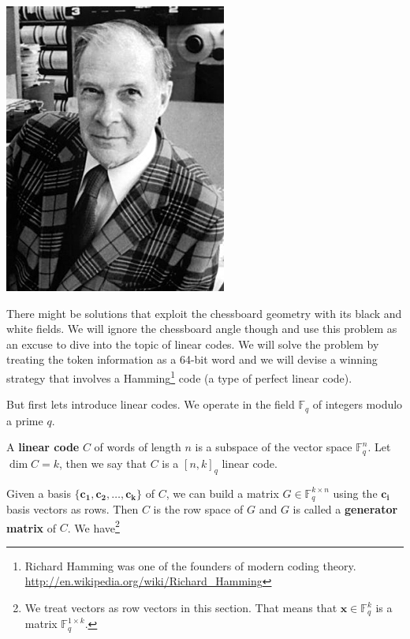 \begin{marginfigure}[0.0in]
\includegraphics[scale=0.5]{Richard_Hamming.jpg}
\end{marginfigure}

There might be solutions that exploit the chessboard geometry with its black and white fields. We will ignore the chessboard angle though and use this problem as an excuse to dive into the topic of linear codes. We will solve the problem by treating the token information as a 64-bit word and we will devise a winning strategy that involves a Hamming\footnote{Richard Hamming was one of the founders of modern coding theory. \url{http://en.wikipedia.org/wiki/Richard_Hamming}} code (a type of perfect linear code).

But first lets introduce linear codes. We operate in the field $\mathbb{F}_q$ of integers modulo a prime $q$. 

\begin{defn}\label{linearCodeDef}
A \textbf{linear code} $C$ of words of length $n$ is a subspace of the vector space $\mathbb{F}^n_q$. Let $\dim C = k$, then we say that $C$ is a $[n, k]_q$ linear code.
\end{defn}

Given a basis $\{\bm{c_1}, \bm{c_2}, \ldots, \bm{c_k}\}$ of $C$, we can build a matrix $G \in \mathbb{F}_q^{k \times n}$ using the $\bm{c_i}$ basis vectors as rows. Then $C$ is the row space of $G$ and $G$ is called a \textbf{generator matrix} of $C$. We have\footnote{We treat vectors as row vectors in this section. That means that $\bm{x} \in \mathbb{F}_q^k$ is a matrix $\mathbb{F}_q^{1 \times k}$.}

